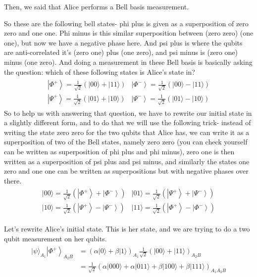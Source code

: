 Then, we said that Alice performs a Bell basis measurement.

So these are the following bell states- phi plus is given as a superposition of zero zero and one one. Phi minus is this similar superposition between (zero zero) (one one), but now we have a negative phase here. And psi plus is where the qubits are anti-correlated it's (zero one) plus (one zero), and psi minus is (zero one) minus (one zero). And doing a measurement in these Bell basis is basically asking the question: which of these following states is Alice's state in? 
\begin{align}
    \begin{array}{ll}
\left|\Phi^{+}\right\rangle=\frac{1}{\sqrt{2}}(|00\rangle+|11\rangle) & \left|\Phi^{-}\right\rangle=\frac{1}{\sqrt{2}}(|00\rangle-|11\rangle) \\
\left|\Psi^{+}\right\rangle=\frac{1}{\sqrt{2}}(|01\rangle+|10\rangle) & \left|\Psi^{-}\right\rangle=\frac{1}{\sqrt{2}}(|01\rangle-|10\rangle)
\end{array}
\end{align}
So to help us with answering that question, we have to rewrite our initial state in a slightly different form, and to do that we will use the following trick- instead of writing the state zero zero for the two qubits that Alice has, we can write it as a superposition of two of the Bell states, namely zero zero (you can check yourself can be written as superposition of phi plus and phi minus), zero one is then written as a superposition of psi plus and psi minus, and similarly the states one zero and one one can be written as superpositions but with negative phases over there.
\begin{align}
    \begin{array}{ll}
|00\rangle=\frac{1}{\sqrt{2}}\left(\left|\Phi^{+}\right\rangle+\left|\Phi^{-}\right\rangle\right) & |01\rangle=\frac{1}{\sqrt{2}}\left(\left|\Psi^{+}\right\rangle+\left|\Psi^{-}\right\rangle\right) \\
|10\rangle=\frac{1}{\sqrt{2}}\left(\left|\Psi^{+}\right\rangle-\left|\Psi^{-}\right\rangle\right) & |11\rangle=\frac{1}{\sqrt{2}}\left(\left|\Phi^{+}\right\rangle-\left|\Phi^{-}\right\rangle\right)
\end{array}
\end{align}

Let's rewrite Alice's initial state. This is her state, and we are trying to do a two qubit measurement on her qubits.
\begin{align}
    \begin{aligned}
|\psi\rangle_{A_{1}}\left|\Phi^{+}\right\rangle_{A_{2} B} &=(\alpha|0\rangle+\beta|1\rangle)_{A_{1}} \frac{1}{\sqrt{2}}(|00\rangle+|11\rangle)_{A_{2} B} \\
&=\frac{1}{\sqrt{2}}(\alpha|000\rangle+\alpha|011\rangle+\beta|100\rangle+\beta|111\rangle)_{A_{1} A_{2} B}
\end{aligned}
\end{align}

